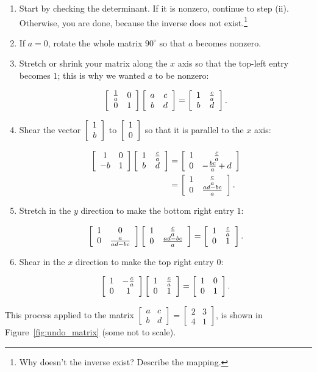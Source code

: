 \documentclass[../textbook.tex]{subfiles}
\begin{document}
\begin{enumerate}[label=\roman*.]
\item Start by checking the determinant. If it is nonzero, continue to step (ii). Otherwise, you are done, because the inverse does not exist.\footnote{Why doesn't the inverse exist? Describe the mapping.}
\setcounter{first_para}{\value{enumi}}
\item If $a=0$, rotate the whole matrix $90^\circ$ so that $a$ becomes nonzero.
\item Stretch or shrink your matrix along the $x$ axis so that the top-left entry becomes $1$; this is why we wanted $a$ to be nonzero:

$$\left[\begin{array}{cc} \frac{1}{a} & 0 \\ 0 & 1 \end{array}\right]\left[\begin{array}{cc} a & c \\ b & d \end{array}\right] = \left[\begin{array}{cc} 1 & \frac{c}{a} \\ b & d \end{array}\right].$$

\item Shear the vector $\left[\begin{array}{c} 1 \\ b \end{array}\right]$ to $\left[\begin{array}{c} 1 \\ 0 \end{array}\right]$ so that it is parallel to the $x$ axis:

\begin{align*}
\left[\begin{array}{cc} 1 & 0 \\ -b & 1 \end{array}\right]\left[\begin{array}{cc} 1 & \frac{c}{a} \\ b & d \end{array}\right] &= \left[\begin{array}{cc} 1 & \frac{c}{a} \\ 0 & -\frac{bc}{a}+d \end{array}\right] \\
&= \left[\begin{array}{cc} 1 & \frac{c}{a} \\ 0 & \frac{ad-bc}{a} \end{array}\right].
\end{align*}

\item Stretch in the $y$ direction to make the bottom right entry $1$:

$$\left[\begin{array}{cc} 1 & 0 \\ 0 & \frac{a}{ad-bc} \end{array}\right]\left[\begin{array}{cc} 1 & \frac{c}{a} \\ 0 & \frac{ad-bc}{a} \end{array}\right]=\left[\begin{array}{cc} 1 & \frac{c}{a} \\ 0 & 1 \end{array}\right].$$

\item Shear in the $x$ direction to make the top right entry $0$:

$$\left[\begin{array}{cc} 1 & -\frac{c}{a} \\ 0 & 1 \end{array}\right]\left[\begin{array}{cc} 1 & \frac{c}{a} \\ 0 & 1 \end{array}\right]=\left[\begin{array}{cc} 1 & 0 \\ 0 & 1 \end{array}\right].$$
\end{enumerate}

\noindent This process applied to the matrix $\left[\begin{array}{cc}a & c \\ b & d \end{array}\right]=\left[\begin{array}{cc}2 & 3 \\ 4 & 1 \end{array}\right]$, is shown in Figure~\ref{fig:undo_matrix} (some not to scale).
\end{document}
